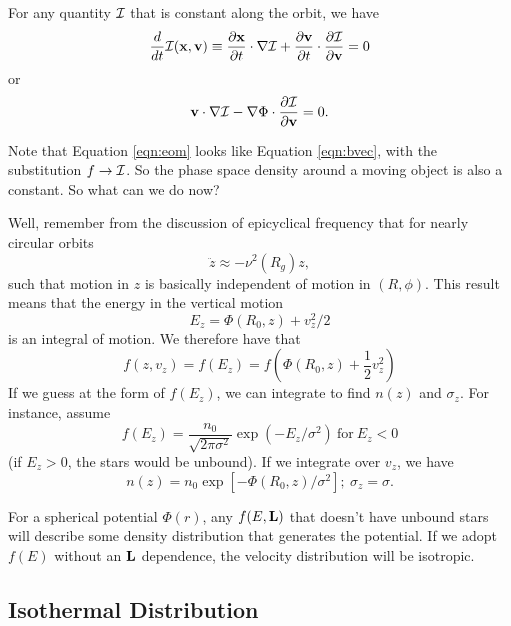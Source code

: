 \documentclass[]{article}
\begin{document}
For any quantity $\mathcal{I}$ that is constant along the orbit, we have
\begin{equation}
\label{eqn:eom}
\frac{d}{dt}\mathcal{I}(\mathbf{x},\mathbf{v}) \equiv \frac{\partial \mathbf{x}}{\partial t} \cdot \nabla \mathcal{I} + \frac{\partial \mathbf{v}}{\partial t} \cdot \frac{\partial \mathcal{I}}{\partial \mathbf{v}} = 0
\end{equation}
\noindent
or\begin{equation}
\mathbf{v} \cdot \nabla \mathcal{I} - \nabla \Phi \cdot \frac{\partial \mathcal{I}}{\partial \mathbf{v}} = 0.
\end{equation}

Note that Equation \ref{eqn:eom} looks like Equation \ref{eqn:bvec}, with the substitution
$f\to\mathcal{I}$. So the phase space density around a moving object is also a constant.
So what can we do now?

Well, remember from the discussion of epicyclical frequency that for nearly circular orbits
\begin{equation}
\ddot{z} \approx - \nu^2(R_g)z,
\end{equation}
\noindent
such that motion in $z$ is basically independent of motion in $(R,\phi)$. This result
means that the energy in the vertical motion
\begin{equation}
E_z = \Phi(R_0,z) + v_z^2/2
\end{equation}
\noindent
is an integral of motion. We therefore have that
\begin{equation}
f(z,v_z) = f(E_z) = f\left(\Phi(R_0,z) + \frac{1}{2}v_z^2\right)
\end{equation}
\noindent
If we guess at the form of $f(E_z)$, we can integrate to find $n(z)$ and $\sigma_z$.
For instance, assume
\begin{equation}
f(E_z) = \frac{n_0}{\sqrt{2\pi\sigma^2}}\exp(-E_z/\sigma^2)~\mathrm{for}~E_z<0
\end{equation}
(if $E_z>0$, the stars would be unbound).  If we integrate over $v_z$, we have
\begin{equation}
\label{eqn:isothermal}
n(z) = n_0 \exp\left[-\Phi(R_0,z)/\sigma^2\right];~\sigma_z = \sigma.
\end{equation}

For a spherical potential $\Phi(r)$, any $f(E,\mathbf{L})$ that doesn't have unbound stars will
describe some density distribution that generates the potential.  If we adopt $f(E)$ without
an $\mathbf{L}$ dependence, the velocity distribution will be isotropic.

\subsection{Isothermal Distribution}
\end{document}
